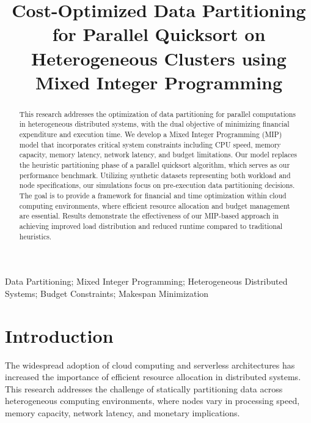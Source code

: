 \documentclass[]{interact}
\theoremstyle{plain}
\theoremstyle{definition}
\theoremstyle{remark}
\begin{document}

\title{Cost-Optimized Data Partitioning for Parallel Quicksort on Heterogeneous Clusters using Mixed Integer Programming}

\author{
}

\maketitle

\begin{abstract}
This research addresses the optimization of data partitioning for parallel computations in heterogeneous distributed systems, with the dual objective of minimizing financial expenditure and execution time. We develop a Mixed Integer Programming (MIP) model that incorporates critical system constraints including CPU speed, memory capacity, memory latency, network latency, and budget limitations. Our model replaces the heuristic partitioning phase of a parallel quicksort algorithm, which serves as our performance benchmark. Utilizing synthetic datasets representing both workload and node specifications, our simulations focus on pre-execution data partitioning decisions. The goal is to provide a framework for financial and time optimization within cloud computing environments, where efficient resource allocation and budget management are essential. Results demonstrate the effectiveness of our MIP-based approach in achieving improved load distribution and reduced runtime compared to traditional heuristics.
\end{abstract}

\begin{keywords}
Data Partitioning; Mixed Integer Programming; Heterogeneous Distributed Systems; Budget Constraints; Makespan Minimization
\end{keywords}

\section{Introduction}

The widespread adoption of cloud computing and serverless architectures has increased the importance of efficient resource allocation in distributed systems. This research addresses the challenge of statically partitioning data across heterogeneous computing environments, where nodes vary in processing speed, memory capacity, network latency, and monetary implications.
\end{document}
